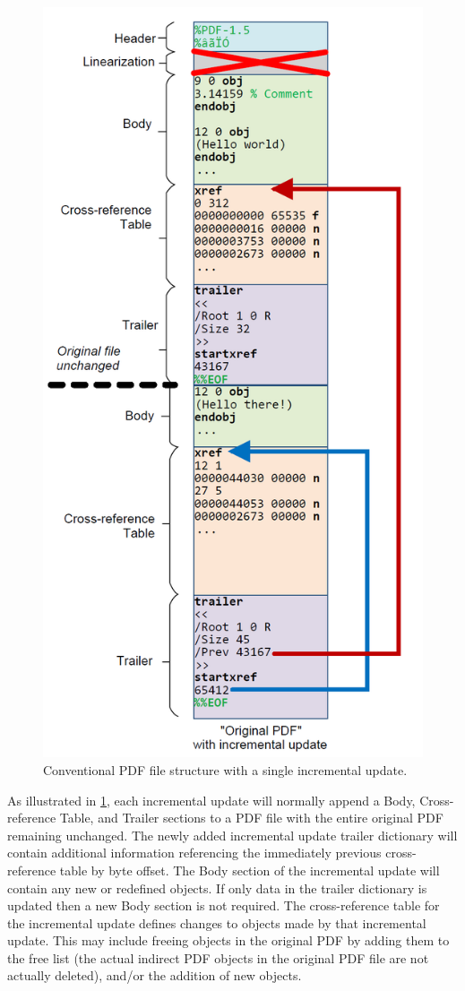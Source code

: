 \begin{figure}[t]
    \centering
    \includegraphics[width=0.65\linewidth]{figures/pdf-structure-incremental.png}
    \caption{Conventional PDF file structure with a single incremental update.}
    \label{fig:pdf-structure-incremental}
\end{figure}

As illustrated in \cref{fig:pdf-structure-incremental}, each incremental update will 
normally append a Body, Cross-reference Table, and Trailer sections
to a PDF file with the entire original PDF remaining unchanged. The newly added incremental
update trailer dictionary will contain additional information referencing the immediately 
previous cross-reference table by byte offset. The Body section of the incremental update 
will contain any new or redefined objects. If only data in the trailer dictionary is updated then
a new Body section is not required. The cross-reference table for the incremental update
defines changes to objects made by that incremental update. This may include freeing
objects in the original PDF by adding them to the free list (the actual indirect PDF objects in
the original PDF file are not actually deleted), and/or the addition of new objects. 


